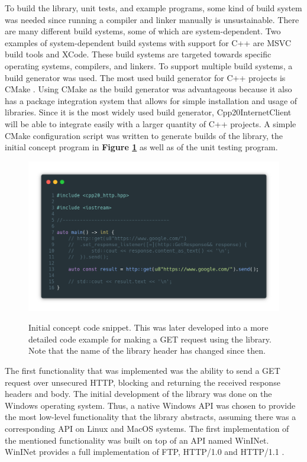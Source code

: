 \documentclass[12pt, a4paper]{article}
\begin{document}
To build the library, unit tests, and example programs, some kind of build system was needed since running a compiler and linker manually is unsustainable. There are many different build systems, some of which are system-dependent. Two examples of system-dependent build systems with support for C++ are MSVC build tools and XCode. These build systems are targeted towards specific operating systems, compilers, and linkers. To support multiple build systems, a build generator was used. The most used build generator for C++ projects is CMake \parencite{DeveloperStatistics}. Using CMake as the build generator was advantageous because it also has a package integration system that allows for simple installation and usage of libraries. Since it is the most widely used build generator, Cpp20InternetClient will be able to integrate easily with a larger quantity of C++ projects. A simple CMake configuration script was written to generate builds of the library, the initial concept program in \textbf{Figure \ref{fig:concept_snippet}} as well as of the unit testing program.

\begin{figure}[hp]
	\centering
	\caption{Initial concept code snippet. This was later developed into a more detailed code example for making a GET request using the library. Note that the name of the library header has changed since then.}
	\includegraphics[width=\textwidth]{concept_snippet}
	\label{fig:concept_snippet}
\end{figure}

The first functionality that was implemented was the ability to send a GET request over unsecured HTTP, blocking and returning the received response headers and body. The initial development of the library was done on the Windows operating system. Thus, a native Windows API was chosen to provide the most low-level functionality that the library abstracts, assuming there was a corresponding API on Linux and MacOS systems. The first implementation of the mentioned functionality was built on top of an API named WinINet. WinINet provides a full implementation of FTP, HTTP/1.0 and HTTP/1.1 \parencite{MicrosoftWinINet}. 
\end{document}
